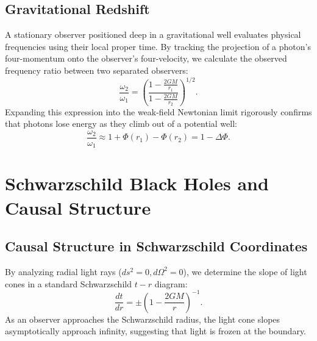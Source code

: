 \documentclass[11pt, a4paper]{report}
\begin{document}
\subsection{Gravitational Redshift}
A stationary observer positioned deep in a gravitational well evaluates physical frequencies using their local proper time. By tracking the projection of a photon's four-momentum onto the observer's four-velocity, we calculate the observed frequency ratio between two separated observers:
\begin{equation}
\frac{\omega_{2}}{\omega_{1}} = \left( \frac{1-\frac{2GM}{r_{1}}}{1-\frac{2GM}{r_{2}}} \right)^{1/2}.
\end{equation}
Expanding this expression into the weak-field Newtonian limit rigorously confirms that photons lose energy as they climb out of a potential well:
\begin{equation}
\frac{\omega_{2}}{\omega_{1}} \approx 1 + \Phi(r_{1}) - \Phi(r_{2}) = 1 - \Delta\Phi.
\end{equation}

\section{Schwarzschild Black Holes and Causal Structure}
\subsection{Causal Structure in Schwarzschild Coordinates}
By analyzing radial light rays ($ds^2 = 0, d\Omega^2 = 0$), we determine the slope of light cones in a standard Schwarzschild $t-r$ diagram:
\begin{equation}
\label{eq:radial_light_cone}
\frac{dt}{dr} = \pm \left( 1 - \frac{2GM}{r} \right)^{-1}.
\end{equation}
As an observer approaches the Schwarzschild radius, the light cone slopes asymptotically approach infinity, suggesting that light is frozen at the boundary.
\end{document}
